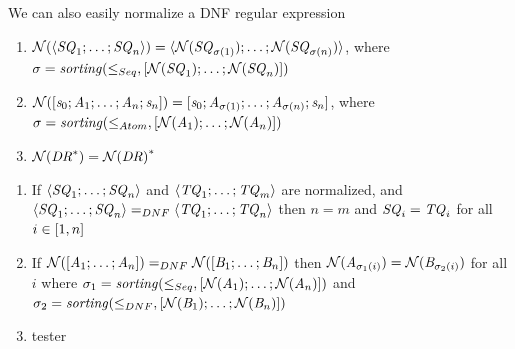 We can also easily normalize a DNF regular expression

\begin{definition}
  \begin{enumerate}
  \item $\mathcal{N}(\langle\mathit{SQ}_1;\ldots;\mathit{SQ}_n\rangle) =
    \langle\mathcal{N}(\mathit{SQ}_{\sigma(1)});\ldots;\mathcal{N}(\mathit{SQ}_{\sigma(n)})\rangle$,
    where
    $\sigma=\mathit{sorting}(\leq_{Seq},[ \mathcal{N}(\mathit{SQ}_1);\ldots;\mathcal{N}(\mathit{SQ}_n) ])$
  \item $\mathcal{N}([\mathit{s}_0;\mathit{A}_1;\ldots;\mathit{A}_n;\mathit{s}_n]) =
    [\mathit{s}_0;\mathit{A}_{\sigma(1)};\ldots;\mathit{A}_{\sigma(n)};\mathit{s}_n]$,
    where
    $\sigma=\mathit{sorting}(\leq_{Atom},[ \mathcal{N}(\mathit{A}_1);\ldots;\mathcal{N}(\mathit{A}_n) ])$
  \item $\mathcal{N}({\mathit{DR}}^*)={\mathcal{N}(\mathit{DR})}^*$
  \end{enumerate}
\end{definition}

\begin{theorem}
  \begin{enumerate}
  \item
    If $\langle\mathit{SQ}_1;\ldots;\mathit{SQ}_n\rangle$ and
    $\langle\mathit{TQ}_1;\ldots;\mathit{TQ}_m\rangle$ are normalized, and
    $\langle\mathit{SQ}_1;\ldots;\mathit{SQ}_n\rangle=_{DNF}\langle\mathit{TQ}_1;\ldots;\mathit{TQ}_n\rangle$
    then
    $n=m$ and
    $\mathit{SQ}_i = \mathit{TQ}_i$ for all $i\in[1,n]$
  \item
    If $\mathcal{N}([\mathit{A}_1;\ldots;\mathit{A}_n]) =_{DNF}
    \mathcal{N}([\mathit{B}_1;\ldots;\mathit{B}_n])$ then
    $\mathcal{N}(\mathit{A}_{\sigma_1(i)}) =
    \mathcal{N}(\mathit{B}_{\sigma_2(i)})$ for all $i$
    where $\sigma_1 =
    \mathit{sorting}(\leq_{Seq},[ \mathcal{N}(\mathit{A}_1);\ldots;\mathcal{N}(\mathit{A}_n) ])$
    and $\sigma_2 =
    \mathit{sorting}(\leq_{DNF},[ \mathcal{N}(\mathit{B}_1);\ldots;\mathcal{N}(\mathit{B}_n) ])$
  \item
    tester
  \end{enumerate}
\end{theorem}

